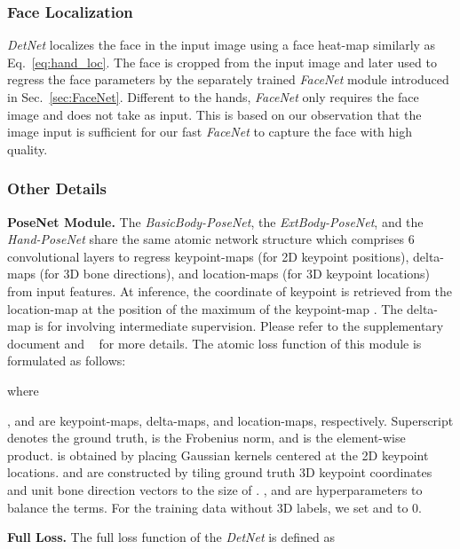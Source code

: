 \documentclass[final]{cvpr}
\begin{document}
\subsubsection{Face Localization \vspace{-1mm}}
\textit{DetNet} localizes the face in the input image using a face heat-map  similarly as Eq.~\ref{eq:hand_loc}.
The face is cropped from the input image and later used to regress the face parameters by the separately trained \textit{FaceNet} module introduced in Sec.~\ref{sec:FaceNet}.
Different to the hands, \textit{FaceNet} only requires the face image and does not take  as input.
This is based on our observation that the image input is sufficient for our fast \textit{FaceNet} to capture the face with high quality.
\par
\vspace{-3mm}
\subsubsection{Other Details \vspace{-1mm}}
\noindent \textbf{PoseNet Module.}
\label{sec:posenet}
The \textit{BasicBody-PoseNet}, the \textit{ExtBody-PoseNet}, and the \textit{Hand-PoseNet} share the same atomic network structure which comprises 6 convolutional layers to regress keypoint-maps  (for 2D keypoint positions), delta-maps  (for 3D bone directions), and location-maps  (for 3D keypoint locations) from input features.
At inference, the coordinate of keypoint  is retrieved from the location-map  at the position of the maximum of the keypoint-map .
The delta-map  is for involving intermediate supervision.
Please refer to the supplementary document and ~\cite{mehta2017vnect} for more details.
The atomic loss function of this module is formulated as follows:

where



,  and  are keypoint-maps, delta-maps, and location-maps, respectively.
Superscript  denotes the ground truth,  is the Frobenius norm, and  is the element-wise product.
 is obtained by placing Gaussian kernels centered at the 2D keypoint locations.
 and  are constructed by tiling ground truth 3D keypoint coordinates and unit bone direction vectors to the size of .
,  and  are hyperparameters to balance the terms.
For the training data without 3D labels, we set  and  to 0.
\par
\noindent \textbf{Full Loss.}
The full loss function of the \textit{DetNet} is defined as
\end{document}
